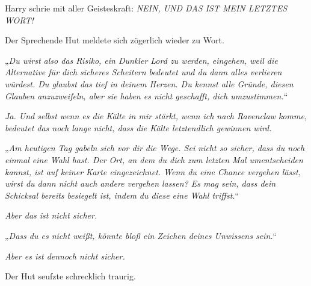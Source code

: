 Harry schrie mit aller Geisteskraft: \emph{NEIN, UND DAS IST MEIN LETZTES WORT!}

Der Sprechende Hut meldete sich zögerlich wieder zu Wort.

„\emph{Du wirst also das Risiko, ein Dunkler Lord zu werden, eingehen, weil die Alternative für dich sicheres Scheitern bedeutet und du dann alles verlieren würdest. Du glaubst das tief in deinem Herzen. Du kennst alle Gründe, diesen Glauben anzuzweifeln, aber sie haben es nicht geschafft, dich umzustimmen.}“

\emph{Ja. Und selbst wenn es die Kälte in mir \emph{stärkt}, wenn ich nach Ravenclaw komme, bedeutet das noch lange nicht, dass die Kälte letztendlich \emph{gewinnen} wird.}

„\emph{Am heutigen Tag gabeln sich vor dir die Wege. Sei nicht so sicher, dass du noch einmal eine Wahl hast. Der Ort, an dem du dich zum \emph{letzten} Mal umentscheiden kannst, ist auf keiner Karte eingezeichnet. Wenn du eine Chance vergehen lässt, wirst du dann nicht auch andere vergehen lassen? Es mag sein, dass dein Schicksal bereits besiegelt ist, indem du diese eine Wahl triffst.}“

\emph{Aber das ist nicht sicher. }

„\emph{Dass \emph{du} es nicht \emph{weißt}, könnte bloß ein Zeichen \emph{deines} Unwissens sein.}“

\emph{Aber es ist dennoch nicht sicher.}

Der Hut seufzte schrecklich traurig.

